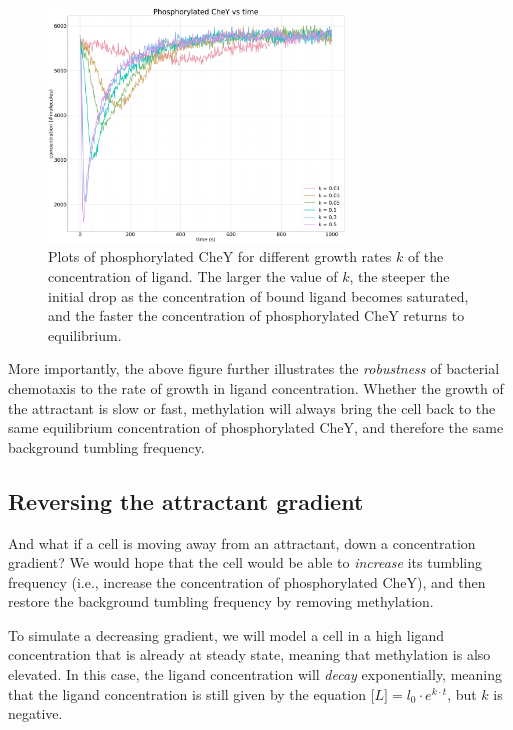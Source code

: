 \begin{figure}[h]
\centering
\mySfFamily
\includegraphics[width = 0.7\textwidth]{../images/chemotaxis_tutorial_addition03.png}
\caption{Plots of phosphorylated CheY for different growth rates $k$ of the concentration of ligand. The larger the value of $k$, the steeper the initial drop as the concentration of bound ligand becomes saturated, and the faster the concentration of phosphorylated CheY returns to equilibrium.}
\label{fig:chemotaxis_tutorial_addition03}
\end{figure}

More importantly, the above figure further illustrates the \textit{robustness} of bacterial chemotaxis to the rate of growth in ligand concentration. Whether the growth of the attractant is slow or fast, methylation will always bring the cell back to the same equilibrium concentration of phosphorylated CheY, and therefore the same background tumbling frequency.

\FloatBarrier
{}
\subsection{Reversing the attractant gradient}

And what if a cell is moving away from an attractant, down a concentration gradient? We would hope that the cell would be able to \textit{increase} its tumbling frequency (i.e., increase the concentration of phosphorylated CheY), and then restore the background tumbling frequency by removing methylation.

To simulate a decreasing gradient, we will model a cell in a high ligand concentration that is already at steady state, meaning that methylation is also elevated. In this case, the ligand concentration will \textit{decay} exponentially, meaning that the ligand concentration is still given by the equation $\text{[}L{]} = l_0 \cdot e^{k \cdot t}$, but $k$ is negative.\\

